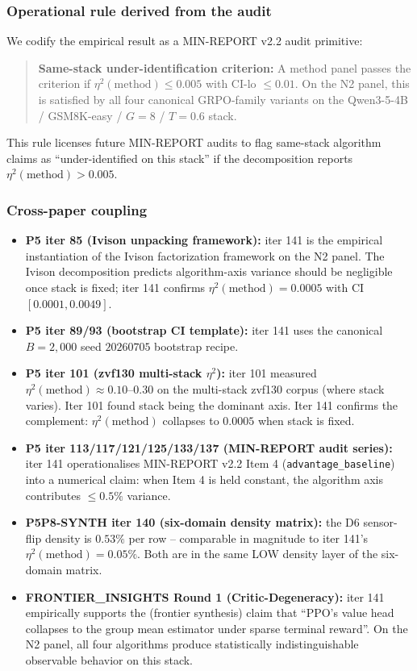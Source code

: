\subsubsection{Operational rule derived from the audit}

We codify the empirical result as a MIN-REPORT v2.2 audit primitive:

\begin{quote}
\textbf{Same-stack under-identification criterion:} A method panel passes
the criterion if $\eta^2(\text{method}) \leq 0.005$ with CI-lo $\leq 0.01$.
On the N2 panel, this is satisfied by all four canonical GRPO-family
variants on the Qwen3-5-4B / GSM8K-easy / $G{=}8$ / $T{=}0.6$ stack.
\end{quote}

\noindent This rule licenses future MIN-REPORT audits to flag same-stack
algorithm claims as ``under-identified on this stack'' if the
decomposition reports $\eta^2(\text{method}) > 0.005$.

\subsubsection{Cross-paper coupling}

\begin{itemize}
\item \textbf{P5 iter 85 (Ivison unpacking framework):} iter 141 is the
empirical instantiation of the Ivison factorization framework on the N2
panel. The Ivison decomposition predicts algorithm-axis variance should
be negligible once stack is fixed; iter 141 confirms
$\eta^2(\text{method}) = 0.0005$ with CI $[0.0001, 0.0049]$.
\item \textbf{P5 iter 89/93 (bootstrap CI template):} iter 141 uses the
canonical $B{=}2{,}000$ seed $20260705$ bootstrap recipe.
\item \textbf{P5 iter 101 (zvf130 multi-stack $\eta^2$):} iter 101
measured $\eta^2(\text{method}) \approx 0.10$--$0.30$ on the multi-stack
zvf130 corpus (where stack varies). Iter 101 found stack being the
dominant axis. Iter 141 confirms the complement: $\eta^2(\text{method})$
collapses to $0.0005$ when stack is fixed.
\item \textbf{P5 iter 113/117/121/125/133/137 (MIN-REPORT audit series):}
iter 141 operationalises MIN-REPORT v2.2 Item 4 (\texttt{advantage\_baseline})
into a numerical claim: when Item 4 is held constant, the algorithm axis
contributes $\leq 0.5\%$ variance.
\item \textbf{P5P8-SYNTH iter 140 (six-domain density matrix):} the D6
sensor-flip density is $0.53\%$ per row -- comparable in magnitude to
iter 141's $\eta^2(\text{method}) = 0.05\%$. Both are in the same LOW
density layer of the six-domain matrix.
\item \textbf{FRONTIER\_INSIGHTS Round 1 (Critic-Degeneracy):} iter 141
empirically supports the (frontier synthesis) claim that ``PPO's value
head collapses to the group mean estimator under sparse terminal reward''.
On the N2 panel, all four algorithms produce statistically indistinguishable
observable behavior on this stack.
\end{itemize}

